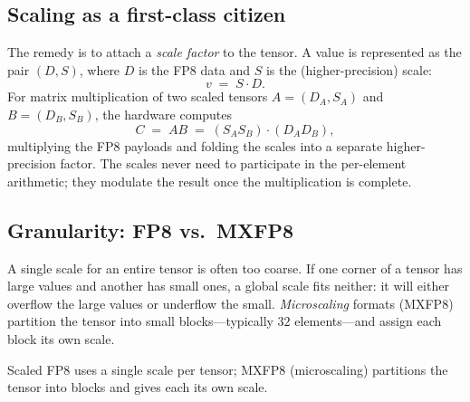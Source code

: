 \documentclass[11pt,a4paper]{article}
\theoremstyle{definition}
\theoremstyle{remark}
\theoremstyle{plain}
\begin{document}
\subsection{Scaling as a first-class citizen}

The remedy is to attach a \emph{scale factor} to the tensor. A value is
represented as the pair $(D, S)$, where $D$ is the FP8 data and $S$ is
the (higher-precision) scale:
\begin{equation}
v \;=\; S \cdot D.
\end{equation}
For matrix multiplication of two scaled tensors $A = (D_A, S_A)$ and
$B = (D_B, S_B)$, the hardware computes
\begin{equation}
C \;=\; A B \;=\; (S_A S_B) \cdot (D_A D_B),
\end{equation}
multiplying the FP8 payloads and folding the scales into a separate
higher-precision factor. The scales never need to participate in the
per-element arithmetic; they modulate the result once the multiplication
is complete.

\subsection{Granularity: FP8 vs.\ MXFP8}

A single scale for an entire tensor is often too coarse. If one corner of
a tensor has large values and another has small ones, a global scale fits
neither: it will either overflow the large values or underflow the small.
\emph{Microscaling} formats (MXFP8) partition the tensor into small
blocks---typically $32$ elements---and assign each block its own scale.

\begin{center}
\par\smallskip
{\small Scaled FP8 uses a single scale per tensor; MXFP8 (microscaling)
partitions the tensor into blocks and gives each its own scale.}
\end{center}
\end{document}
